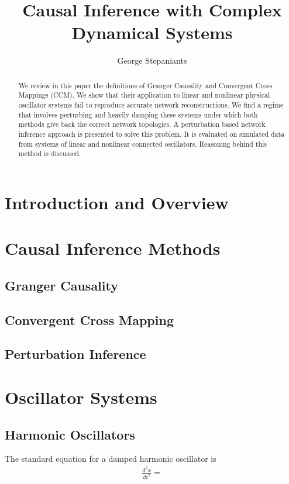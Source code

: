 \documentclass[]{article}
\title{Causal Inference with Complex Dynamical Systems}
\author{George Stepaniants}
\begin{document}
\maketitle
\begin{abstract}
We review in this paper the definitions of Granger Causality and Convergent Cross Mappings (CCM). We show that their application to linear and nonlinear physical oscillator systems fail to reproduce accurate network reconstructions. We find a regime that involves perturbing and heavily damping these systems under which both methods give back the correct network topologies. A perturbation based network inference approach is presented to solve this problem. It is evaluated on simulated data from systems of linear and nonlinear connected oscillators. Reasoning behind this method is discussed.
\end{abstract}

\section{Introduction and Overview}


\section{Causal Inference Methods}
\subsection{Granger Causality}

\subsection{Convergent Cross Mapping}

\subsection{Perturbation Inference}


\section{Oscillator Systems}
\subsection{Harmonic Oscillators}
The standard equation for a damped harmonic oscillator is
\begin{align*}
\frac{d^2x}{dt^2} = 
\end{align*}
\end{document}
